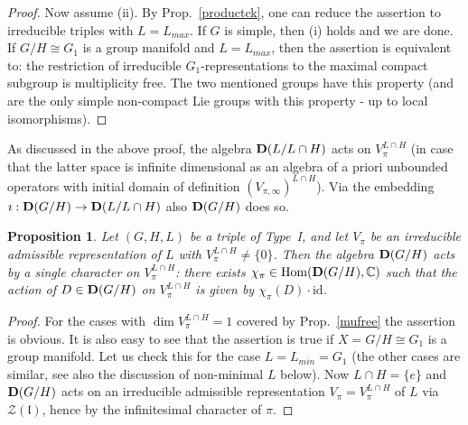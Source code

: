 \documentclass[10]{amsart}
\newtheorem{pro}[thm]{Proposition}
\theoremstyle{remark}
\theoremstyle{definition}
\numberwithin{equation}{section}
\newcommand{\C}{\mathbb{C}}           %
\newcommand{\Hom}{\mathrm{Hom}}
\newcommand{\id}{\mathrm{id}}
\newcommand{\fl}{{\mathfrak l}}
\newcommand{\Cal}{\mathcal}
\begin{document}
{\begin{proof}
Now assume (ii). By Prop.~\ref{productck}, one can reduce the assertion to irreducible triples with $L=L_{max}$. If $G$ is simple, then (i) holds and we are done.
If $G/H\cong G_1$ is a group manifold and $L=L_{max}$, then the assertion is equivalent to: the restriction of irreducible $G_1$-representations to the maximal
compact subgroup is multiplicity free. The two mentioned groups have this property (and are the only simple non-compact Lie groups with this property - up to local isomorphisms).
\end{proof}

As discussed in the above proof, the algebra ${\bf D}(L/L\cap H)$ acts on $V_\pi^{L\cap H}$ (in case that the latter space is infinite dimensional as an algebra of  a  priori unbounded operators
with initial domain of definition $(V_{\pi,\infty})^{L\cap H}$). Via the embedding $\imath: {\bf D}(G/H)\rightarrow {\bf D}(  L/L\cap H)$ also ${\bf D}(G/H)$ does so.

\begin{pro}\label{staun}
Let $(G,H,L)$ be a triple of Type~I, and let $V_\pi$ be an irreducible admissible representation  of $L$ with $V_\pi^{L\cap H}\ne\{0\}$. Then the algebra ${\bf D}(G/H)$ acts by a single character on  $V_\pi^{L\cap H}$:
there exists $\chi_\pi\in\Hom({\bf D}(G/H),\C)$ such that the action of $D\in {\bf D}(G/H)$ on $V_\pi^{L\cap H}$ is given by $\chi_\pi(D)\cdot\id$.
\end{pro}

\begin{proof} For the cases with $\dim V_\pi^{L\cap H}=1$ covered by Prop.~\ref{mufree} the assertion is obvious. It is also easy to see that the assertion is true if $X=G/H\cong G_1$
is a group manifold. Let us check this for the case $L=L_{min}=G_1$ (the other cases are similar, see also the discussion of non-minimal $L$ below). Now $L\cap H=\{e\}$ and ${\bf D}(G/H)$
acts on an irreducible admissible representation $V_\pi=V_\pi^{L\cap H}$ of $L$ via ${\Cal Z}(\fl)$, hence by the infinitesimal character of $\pi$.


\end{proof}}
\end{document}
